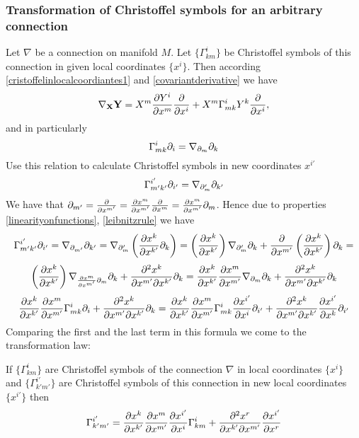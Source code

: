 \documentclass[12pt]{article}
\theoremstyle{theorem}
\numberwithin{equation}{section}
\begin{document}
\subsubsection {Transformation of Christoffel symbols for an arbitrary connection}

 Let $\nabla$ be a connection on manifold $M$.
  Let $\{\Gamma^i_{km}\}$ be Christoffel symbols of this connection in  given local coordinates $\{x^i\}$.
  Then according \eqref{cristoffelinlocalcoordiantes1} and \eqref{covariantderivative} we have
                 $$
              \nabla_{\bf X}{\bf Y}=X^m{\partial Y^i\over \partial x^m}{\partial\over \partial x^i}+X^m\Gamma^i_{mk}Y^k{\partial\over \partial x^i},
                 $$
and in particularly
               $$
               \Gamma^i_{mk}\partial_i=\nabla_{\partial_m}\partial_k
               $$
  Use this relation to calculate Christoffel symbols in new coordinates $x^{i'}$
               $$
            \Gamma^{i'}_{m'k'}\partial_{i'}=
            \nabla_{\partial_m'}\partial_{k'}
               $$
  We have that $\partial_{m'}={\partial\over \partial x^{m'}}={\partial x^m\over \partial x^{m'}}{\partial\over \partial x^{m}}= {\partial x^m\over \partial x^{m'}}\partial_m $.
  Hence due to properties \eqref{linearityonfunctions}, \eqref{leibnitzrule} we have
    $$
          \Gamma^{i'}_{m'k'}\partial_{i'}=
            \nabla_{\partial_{m'}}\partial_{k'}=\nabla_{\partial_m'}\left({\partial x^k\over \partial x^{k'}}\partial_{k}\right)=
            \left({\partial x^k\over \partial x^{k'}}\right)\nabla_{\partial_m'}\partial_{k}+
            {\partial\over \partial x^{m'}}\left({\partial x^k\over \partial x^{k'}}\right)\partial_{k}=
    $$
              $$
    \left({\partial x^k\over \partial x^{k'}}\right)\nabla_{{\partial x^m\over \partial x^{m'}}\partial_m}\partial_{k}+
            {\partial^2  x^k\over \partial x^{m'}\partial x^{k'}}\partial_{k}=
                      {\partial x^k\over \partial x^{k'}}
          {\partial x^m\over \partial x^{m'}}
          \nabla_{\partial_m}\partial_{k}+
           {\partial^2  x^k\over \partial x^{m'}\partial x^{k'}}\partial_{k}
          $$
          $$
     {\partial x^k\over \partial x^{k'}}
          {\partial x^m\over \partial x^{m'}}
          \Gamma_{mk}^i\partial_i+{\partial^2  x^k\over \partial x^{m'}\partial x^{k'}}\partial_{k}=
          {\partial x^k\over \partial x^{k'}}
          {\partial x^m\over \partial x^{m'}}\Gamma_{mk}^i{\partial x^{i'}\over \partial x^i}\partial_{i'}+
          {\partial^2  x^k\over \partial x^{m'}\partial x^{k'}}{\partial x^{i'}\over \partial x^k}\partial_{i'}
          $$
Comparing the first and the last term in this formula we come to the transformation law:

\m

If $\{\Gamma^i_{km}\}$ are Christoffel symbols of the connection $\nabla$ in  local coordinates $\{x^i\}$
and $\{\Gamma^{i'}_{k'm'}\}$ are Christoffel symbols of this connection  in  new local coordinates $\{x^{i'}\}$
then
 \begin{equation}\label{formualfortransformationofconnection}
    \Gamma^{i'}_{k'm'}=
          {\partial x^k\over \partial x^{k'}}
          {\partial x^m\over \partial x^{m'}}
          {\partial x^{i'}\over \partial x^i}
          \Gamma_{km}^i+
    {\partial^2  x^r\over \partial x^{k'}\partial x^{m'}}{\partial x^{i'}\over \partial x^r}
 \end{equation}
\end{document}
